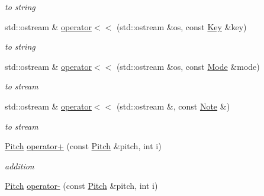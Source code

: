 \begin{DoxyCompactItemize}
\begin{DoxyCompactList}\small\item\em to string \end{DoxyCompactList}\item 
\hypertarget{namespacesinsy_ab02e2ffda7d9b76ad72bcba1fd6a59fa}{std\-::ostream \& \hyperlink{namespacesinsy_ab02e2ffda7d9b76ad72bcba1fd6a59fa}{operator$<$$<$} (std\-::ostream \&os, const \hyperlink{classsinsy_1_1Key}{\-Key} \&key)}\label{namespacesinsy_ab02e2ffda7d9b76ad72bcba1fd6a59fa}

\begin{DoxyCompactList}\small\item\em to string \end{DoxyCompactList}\item 
\hypertarget{namespacesinsy_ab3fd2993e26b7550449006a4588cace8}{std\-::ostream \& \hyperlink{namespacesinsy_ab3fd2993e26b7550449006a4588cace8}{operator$<$$<$} (std\-::ostream \&os, const \hyperlink{classsinsy_1_1Mode}{\-Mode} \&mode)}\label{namespacesinsy_ab3fd2993e26b7550449006a4588cace8}

\begin{DoxyCompactList}\small\item\em to stream \end{DoxyCompactList}\item 
\hypertarget{namespacesinsy_a4a9b3d7588c73acdcf80955bc8f0029e}{std\-::ostream \& \hyperlink{namespacesinsy_a4a9b3d7588c73acdcf80955bc8f0029e}{operator$<$$<$} (std\-::ostream \&, const \hyperlink{classsinsy_1_1Note}{\-Note} \&)}\label{namespacesinsy_a4a9b3d7588c73acdcf80955bc8f0029e}

\begin{DoxyCompactList}\small\item\em to stream \end{DoxyCompactList}\item 
\hypertarget{namespacesinsy_af8f3bbd82c8b9c36feb17d7be231a86d}{\hyperlink{classsinsy_1_1Pitch}{\-Pitch} \hyperlink{namespacesinsy_af8f3bbd82c8b9c36feb17d7be231a86d}{operator+} (const \hyperlink{classsinsy_1_1Pitch}{\-Pitch} \&pitch, int i)}\label{namespacesinsy_af8f3bbd82c8b9c36feb17d7be231a86d}

\begin{DoxyCompactList}\small\item\em addition \end{DoxyCompactList}\item 
\hypertarget{namespacesinsy_a3f16d2b1a542b686aed856bac29f1af7}{\hyperlink{classsinsy_1_1Pitch}{\-Pitch} \hyperlink{namespacesinsy_a3f16d2b1a542b686aed856bac29f1af7}{operator-\/} (const \hyperlink{classsinsy_1_1Pitch}{\-Pitch} \&pitch, int i)}\label{namespacesinsy_a3f16d2b1a542b686aed856bac29f1af7}


\end{DoxyCompactItemize}
